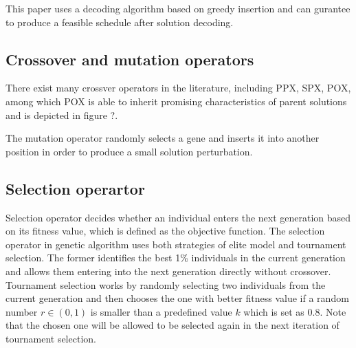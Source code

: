 This paper uses a decoding algorithm based on greedy insertion and can gurantee to produce a feasible schedule after solution decoding.

\subsection{Crossover and mutation operators}
There exist many crossver operators in the literature, including PPX\cite{cheng1999tutorial4}, SPX\citep{wang2001effective5}, POX\citep{zhang6}, among which POX is able to inherit promising characteristics of parent solutions and is depicted in figure ?.

The mutation operator randomly selects a gene and inserts it into another position in order to produce a small solution perturbation.


\subsection{Selection operartor}
Selection operator decides whether an individual enters the next generation based on its fitness value, which is defined as the objective function.
The selection operator in genetic algorithm uses both strategies of elite model and tournament selection.
The former identifies the best 1\% individuals in the current generation and allows them entering into the next generation directly without crossover.
Tournament selection works by randomly selecting two individuals from the current generation and then chooses the one with better fitness value if a random number $r \in (0,1)$ is smaller than a predefined value $k$ which is set as 0.8. 
Note that the chosen one will be allowed to be selected again in the next iteration of tournament selection.



